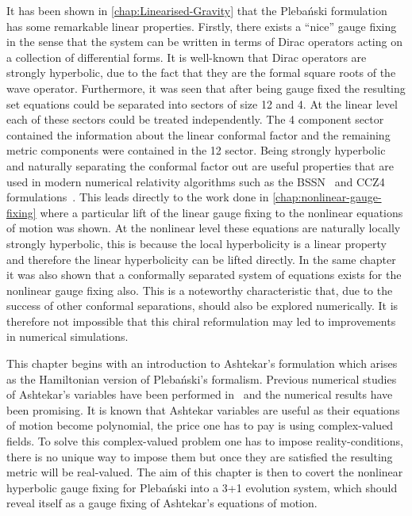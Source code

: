 \documentclass[10pt]{report}
\newcommand{\pleb}[0]{Pleba\'nski}
\theoremstyle{definition}
\begin{document}
    It has been shown in \cref{chap:Linearised-Gravity} that the \pleb{} formulation has some remarkable linear properties. Firstly, there exists a ``nice'' gauge fixing in the sense that the system can be written in terms of Dirac operators acting on a collection of differential forms. It is well-known that Dirac operators are strongly hyperbolic, due to the fact that they are the formal square roots of the wave operator. Furthermore, it was seen that after being gauge fixed the resulting set equations could be separated into sectors of size 12 and 4. At the linear level each of these sectors could be treated independently. The 4 component sector contained the information about the linear conformal factor and the remaining metric components were contained in the 12 sector. Being strongly hyperbolic and naturally separating the conformal factor out are useful properties that are used in modern numerical relativity algorithms such as the BSSN~\cite{NumericalRelatBaumga2010} and CCZ4 formulations~\cite{Conformal_and_c_Alic_2012}. This leads directly to the work done in \cref{chap:nonlinear-gauge-fixing} where a particular lift of the linear gauge fixing to the nonlinear equations of motion was shown. At the nonlinear level these equations are naturally locally strongly hyperbolic, this is because the local hyperbolicity is a linear property and therefore the linear hyperbolicity can be lifted directly. In the same chapter it was also shown that a conformally separated system of equations exists for the nonlinear gauge fixing also. This is a noteworthy characteristic that, due to the success of other conformal separations, should also be explored numerically. It is therefore not impossible that this chiral reformulation may led to improvements in numerical simulations.
    
    This chapter begins with an introduction to Ashtekar's formulation which arises as the Hamiltonian version of \pleb{}'s formalism. Previous numerical studies of Ashtekar's variables have been performed in~\cite{Hyperbolic_form_Yoneda_2001,Formulations_of_Shinka_2008} and the numerical results have been promising. It is known that Ashtekar variables are useful as their equations of motion become polynomial, the price one has to pay is using complex-valued fields. To solve this complex-valued problem one has to impose reality-conditions, there is no unique way to impose them but once they are satisfied the resulting metric will be real-valued. The aim of this chapter is then to covert the nonlinear hyperbolic gauge fixing for \pleb{} into a 3+1 evolution system, which should reveal itself as a gauge fixing of Ashtekar's equations of motion.
\end{document}
